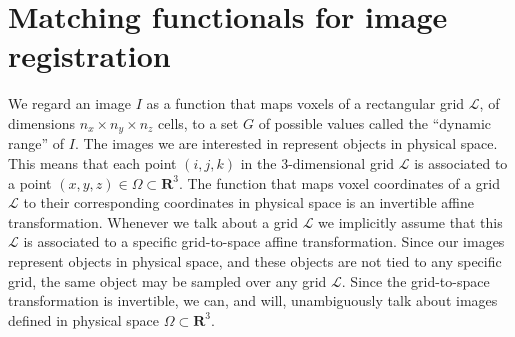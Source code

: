 \section{Matching functionals for image registration}

We regard an image $I$ as a function that maps voxels of a rectangular grid \hbox{$\mathcal{L}$}, of dimensions $n_{x} \times n_{y} \times n_{z}$ cells, to a set $G$ of
possible values called the ``dynamic range'' of $I$. The images we are interested in represent objects in physical space. This means that each point $(i,j,k)$ in the
3-dimensional grid $\mathcal{L}$ is associated to a point $(x,y,z) \in \Omega \subset \mathbf{R}^{3}$. The function that maps voxel coordinates of a grid $\mathcal{L}$ to their corresponding coordinates in physical space is an invertible affine transformation. Whenever we talk about
a grid $\mathcal{L}$ we implicitly assume that this $\mathcal{L}$ is associated to a specific grid-to-space affine transformation.
Since our images represent objects in physical space, and these objects are not tied to any specific grid, the same object may be sampled over any grid $\mathcal{L}$. Since
the grid-to-space transformation is invertible, we can, and will, unambiguously talk about images defined in physical space $\Omega \subset \mathbf{R}^{3}$.\\


